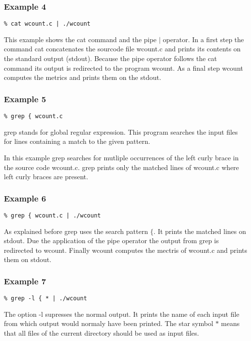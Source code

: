 \documentclass[12pt]{article}
\begin{document}
\subsubsection*{Example 4}
\begin{lstlisting}
% cat wcount.c | ./wcount
\end{lstlisting}
This example shows the cat command and the pipe $|$ operator.  
In a first step the command cat concatenates the sourcode file wcount.c and prints its contents on the standard output (stdout).  
Because the pipe operator follows the cat command its output is redirected to the program wcount.
As a final step wcount computes the metrics and prints them on the stdout.


\subsubsection*{Example 5}
\begin{lstlisting}
% grep { wcount.c
\end{lstlisting}
grep stands for global regular expression. This program searches the input files for lines containing a match to the given pattern.  
  
In this example grep searches for mutliple occurrences of the left curly brace in the source code wcount.c.  
grep prints only the matched lines of wcount.c where left curly braces are present.


\subsubsection*{Example 6}
\begin{lstlisting}
% grep { wcount.c | ./wcount
\end{lstlisting}
As explained before grep uses the search pattern $\{$.  
It prints the matched lines on stdout. Due the application of the pipe operator the output from grep is redirected to wcount. Finally wcount computes the mectris of wcount.c and prints them on stdout.

\subsubsection*{Example 7}
\begin{lstlisting}
% grep -l { * | ./wcount
\end{lstlisting}
The option -l supresses the normal output. It prints the name of each input file from which output would normaly have been printed.
The star symbol  $*$ means that all files of the current directory should be used as input files.
\end{document}
